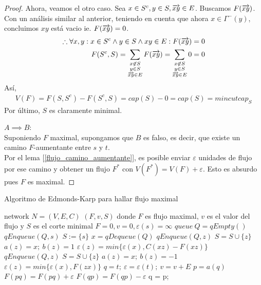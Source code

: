 \begin{proof}
  Ahora, veamos el otro caso. Sea $x \in S^c, y \in S, \overrightarrow{xy} \in E$. Buscamos $F(\overrightarrow{xy})$. Con un análisis similar al anterior, teniendo en cuenta que ahora $x\in \Gamma^-(y)$, concluimos $xy$ está vacio ie. $F(\overrightarrow{xy}) = 0$.
  \begin{align}
    \therefore \forall x, y : x \in S^c \wedge y \in S \wedge xy \in E : F(\overrightarrow{xy}) = 0\\
    F(S^c, S) = \sum_{\substack{x\not\in S\\ y \in S\\ \overrightarrow{xy} \in E}} F(\overrightarrow{xy}) = \sum_{\substack{x\not\in S\\ y \in S\\ \overrightarrow{xy} \in E}} 0 = 0
  \end{align}
  Así,
  \begin{align}
    V(F) = F(S, S^c) - F(S^c, S) = cap(S) - 0 = cap(S) = mincutcap_S
  \end{align}
  Por último, $S$ es claramente minimal.
  
  $A \implies B$:\\
  Suponiendo $F$ maximal, supongamos que $B$ es falso, es decir, que existe un camino $F$-aumentante entre $s$ y $t$.\\
  Por el lema [\ref{flujo_camino_aumentante}], es posible enviar $\varepsilon$ unidades de flujo por ese camino y obtener un flujo $F^*$ con $V({F^*}) = V(F) + \varepsilon$. Esto es absurdo pues $F$ es maximal.
\end{proof}

\begin{algorithm}
  \caption{Algoritmo de Edmonds-Karp para hallar flujo maximal}
  \begin{algorithmic}
    \Require network $N=(V,E,C)$
    \Ensure  $(F, v, S)$ donde $F$ es flujo maximal, $v$ es el valor del flujo y $S$ es el corte minimal
    \State $F = 0, v = 0, \varepsilon(s) = \infty$
    \State $queue\ Q = qEmpty()$
    \State $qEnqueue(Q,s)$
    \State $S := \{s\}$
    \State $x = qDequeue(Q)$
    \State {}
    \State $qEnqueue(Q,z)$
    \State $S = S \cup \{z\}$
    \State $a(z) = x;\ b(z) = 1$
    \State $\varepsilon(z) = min\{\varepsilon(x), C(xz) - F(xz)\}$
    \EndIf
    \EndFor
    \State {}
    \State $qEnqueue(Q,z)$
    \State $S = S \cup \{z\}$
    \State $a(z) = x;\ b(z) = -1$
    \State $\varepsilon(z) = min\{\varepsilon(x), F(zx)\}$
    \EndIf
    \EndFor
    \EndWhile
    \State
    \State $q = t;\ \varepsilon = \varepsilon(t);\ v = v+E$
    \State $p = a(q)$
    \State $F(pq) = F(pq) + \varepsilon$
    \State $F(qp) = F(qp) - \varepsilon$
    \EndIf
    \State q = p;
    \EndWhile
    \Else
    \State {}
    \EndIf
    \EndWhile
    \EndFunction
  \end{algorithmic}
\end{algorithm}

